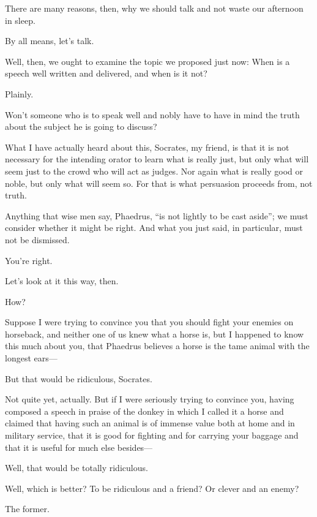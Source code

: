 There are many reasons, then, why we should talk and not waste our
afternoon in sleep.

\sayphaedrus By all means, let’s talk.

\saysocrates Well, then, we ought to examine the topic we proposed
just now: When is a speech well written and delivered, and when is it
not?

\sayphaedrus Plainly.

\saysocrates Won’t someone who is to speak well and nobly have to have in
mind the truth about the subject he is going to discuss?

\sayphaedrus What I have actually heard about this, Socrates, my friend, 
is that it is not necessary for the intending orator to
learn what is really just, but only what will seem just to the crowd who
will act as judges. Nor again what is really good or noble, but only
what will seem so. For that is what persuasion proceeds from, not truth.

\saysocrates Anything that wise men say, Phaedrus, “is not lightly to be
cast aside”; we must
consider whether it might be right. And what you just said, in
particular, must not be dismissed.

\sayphaedrus You’re right.

\saysocrates Let’s look at it this way, then.

\sayphaedrus How?

\saysocrates Suppose I were trying to convince you that you should
fight your enemies on horseback, and neither one of us knew what a horse
is, but I happened to know this much about you, that Phaedrus believes a
horse is the tame animal with the longest ears---

\sayphaedrus But that would be ridiculous, Socrates.

\saysocrates Not quite yet, actually. But if I were seriously trying to
convince you, having composed a speech in praise of the donkey in which
I called it a horse and claimed that having such an animal is of immense
value both at home and in military service, that it is good for fighting
and for carrying your baggage and that it is useful for much else
besides---

\sayphaedrus Well, that would be totally ridiculous.

\saysocrates Well, which is better? To be ridiculous and a friend? Or
clever and an enemy?

\sayphaedrus The former.

